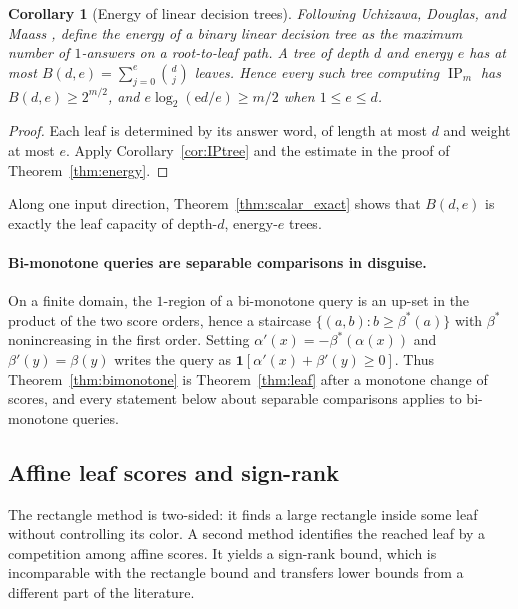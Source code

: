 \documentclass[11pt]{article}
\newtheorem{corollary}[theorem]{Corollary}
\theoremstyle{definition}
\newcommand{\ind}[1]{\mathbf 1[#1]}
\newcommand{\ip}{\operatorname{IP}}
\newcommand{\Eul}{\mathrm e}
\begin{document}
\begin{corollary}[Energy of linear decision trees]\label{cor:tree_energy}
Following Uchizawa, Douglas, and Maass \cite{UDM06}, define the energy of a binary linear decision tree as the maximum number of \(1\)-answers on a root-to-leaf path. A tree of depth \(d\) and energy \(e\) has at most \(B(d,e)=\sum_{j=0}^{e}\binom dj\) leaves. Hence every such tree computing \(\ip_m\) has \(B(d,e)\ge2^{m/2}\), and \(e\log_2(\Eul d/e)\ge m/2\) when \(1\le e\le d\).
\end{corollary}
\begin{proof}
Each leaf is determined by its answer word, of length at most \(d\) and weight at most \(e\). Apply Corollary~\ref{cor:IPtree} and the estimate in the proof of Theorem~\ref{thm:energy}.
\end{proof}
Along one input direction, Theorem~\ref{thm:scalar_exact} shows that \(B(d,e)\) is exactly the leaf capacity of depth-\(d\), energy-\(e\) trees.

\paragraph{Bi-monotone queries are separable comparisons in disguise.}
On a finite domain, the \(1\)-region of a bi-monotone query is an up-set in the product of the two score orders, hence a staircase \(\{(a,b):b\ge\beta^*(a)\}\) with \(\beta^*\) nonincreasing in the first order. Setting \(\alpha'(x)=-\beta^*(\alpha(x))\) and \(\beta'(y)=\beta(y)\) writes the query as \(\ind{\alpha'(x)+\beta'(y)\ge0}\). Thus Theorem~\ref{thm:bimonotone} is Theorem~\ref{thm:leaf} after a monotone change of scores, and every statement below about separable comparisons applies to bi-monotone queries.

\subsection{Affine leaf scores and sign-rank}\label{sec:signrank}
The rectangle method is two-sided: it finds a large rectangle inside some leaf without controlling its color. A second method identifies the reached leaf by a competition among affine scores. It yields a sign-rank bound, which is incomparable with the rectangle bound and transfers lower bounds from a different part of the literature.
\end{document}
